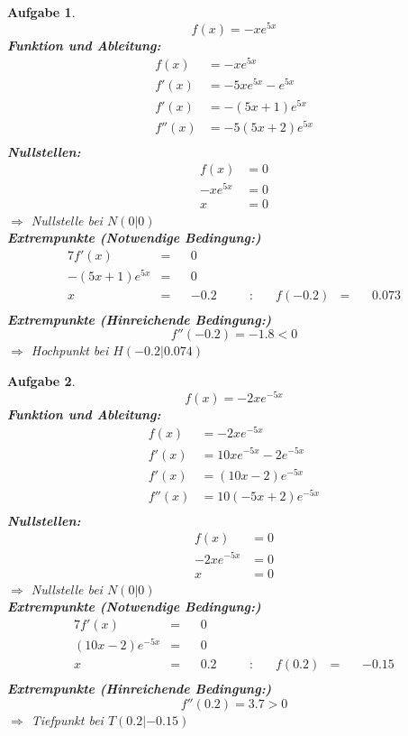 \documentclass[12pt]{article}
\theoremstyle{note}
\newtheorem{aufgabe}{Aufgabe}
\begin{document}
\begin{flushleft}
\begin{aufgabe} ~  
$$f(x)=- x e^{5 x}$$ 
{\bf Funktion und Ableitung:} 
\begin{align*} 
f(x)&=- x e^{5 x}\\ 
f'(x)&=- 5 x e^{5 x} - e^{5 x}\\ 
f'(x)&=- \left(5 x + 1\right) e^{5 x}\\ 
f''(x)&=- 5 \left(5 x + 2\right) e^{5 x}\\ 
\end{align*} 
{\bf Nullstellen:} 
\begin{align*} 
f(x)&=0 \\ 
- x e^{5 x}&=0 \\ 
x&=0\end{align*} 
$\Rightarrow$ Nullstelle bei $N(0|0)$ \\ 
{\bf Extrempunkte (Notwendige Bedingung:)} 
\begin{alignat*}{7} 
f'(x)&=& &0& \\ 
- \left(5 x + 1\right) e^{5 x}&=& &0& \\ 
x&=& &-0.2& \quad &:& \quad f(-0.2)&=& \, &0.073\\ 
\end{alignat*} 
{\bf Extrempunkte (Hinreichende Bedingung:)} 
\\ 
$$f''(-0.2)=-1.8< 0 $$ 
$\Rightarrow$ Hochpunkt bei $H(-0.2|0.074)$ \\ 

\end{aufgabe}\clearpage\begin{aufgabe} ~  
$$f(x)=- 2 x e^{- 5 x}$$ 
{\bf Funktion und Ableitung:} 
\begin{align*} 
f(x)&=- 2 x e^{- 5 x}\\ 
f'(x)&=10 x e^{- 5 x} - 2 e^{- 5 x}\\ 
f'(x)&=\left(10 x - 2\right) e^{- 5 x}\\ 
f''(x)&=10 \left(- 5 x + 2\right) e^{- 5 x}\\ 
\end{align*} 
{\bf Nullstellen:} 
\begin{align*} 
f(x)&=0 \\ 
- 2 x e^{- 5 x}&=0 \\ 
x&=0\end{align*} 
$\Rightarrow$ Nullstelle bei $N(0|0)$ \\ 
{\bf Extrempunkte (Notwendige Bedingung:)} 
\begin{alignat*}{7} 
f'(x)&=& &0& \\ 
\left(10 x - 2\right) e^{- 5 x}&=& &0& \\ 
x&=& &0.2& \quad &:& \quad f(0.2)&=& \, &-0.15\\ 
\end{alignat*} 
{\bf Extrempunkte (Hinreichende Bedingung:)} 
\\ 
$$f''(0.2)=3.7> 0 $$ 
$\Rightarrow$ Tiefpunkt bei $T(0.2|-0.15)$ \\ 


\end{aufgabe}
\end{flushleft}
\end{document}
